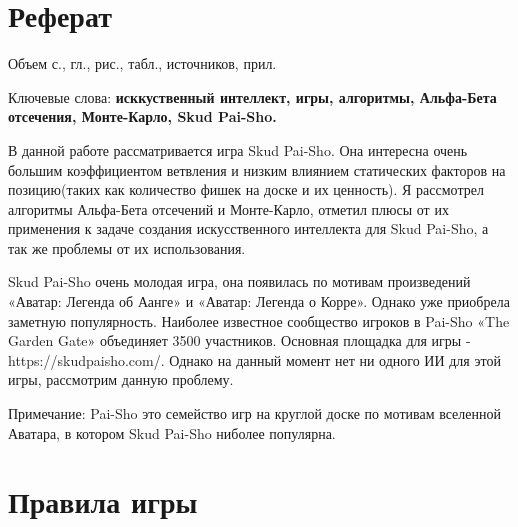 \documentclass[a4paper,12pt]{diplom}
\begin{document}
\Kursovaya
{}

\maketitle

\chapter*{Реферат}

Объем  с.,  гл.,  рис.,
 табл.,  источников,  прил.

\medskip

Ключевые слова: \textbf{исккуственный интеллект, игры, алгоритмы, Альфа-Бета отсечения, Монте-Карло, Skud Pai-Sho.}

\medskip

В данной работе рассматривается игра Skud Pai-Sho. Она интересна очень большим коэффициентом ветвления и низким влиянием статических факторов на позицию(таких как количество фишек на доске и их ценность). Я рассмотрел алгоритмы Альфа-Бета отсечений и Монте-Карло, отметил плюсы от их применения к задаче создания искусственного интеллекта для Skud Pai-Sho, а так же проблемы от их использования.

\tableofcontents[Содержание]


Skud Pai-Sho очень молодая игра, она появилась по мотивам произведений «Аватар: Легенда об Аанге» и «Аватар: Легенда о Корре». Однако уже приобрела заметную популярность. Наиболее известное сообщество игроков в Pai-Sho «The Garden Gate» объединяет 3500 участников. Основная площадка для игры - https://skudpaisho.com/. Однако на данный момент нет ни одного ИИ для этой игры, рассмотрим данную проблему. 

Примечание: Pai-Sho это семейство игр на круглой доске по мотивам вселенной Аватара, в котором Skud Pai-Sho ниболее популярна.

\chapter{Правила игры}
\end{document}
